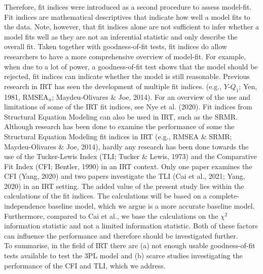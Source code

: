 \documentclass[Royal,sageapa,times,doublespace]{sagej}
\begin{document}
\indent Therefore, fit indices were introduced as a second procedure to assess model-fit. Fit indices are mathematical descriptives that indicate how well a model fits to the data. Note, however, that fit indices alone are not sufficient to infer whether a model fits well as they are not an inferential statistic and only describe the overall fit. Taken together with goodness-of-fit tests, fit indices do allow researchers to have a more comprehensive overview of model-fit. For example, when due to a lot of power, a goodness-of-fit test shows that the model should be rejected, fit indices can indicate whether the model is still reasonable. Previous research in IRT has seen the development of multiple fit indices. (e.g., $Y\text{-}Q_1$; Yen, 1981, $\text{RMSEA}_n$; Maydeu-Olivares \& Joe, 2014). For an overview of the use and limitations of some of the IRT fit indices, see Nye et al. (2020). Fit indices from Structural Equation Modeling can also be used in IRT, such as the SRMR. Although research has been done to examine the performance of some the Structural Equation Modeling fit indices in IRT (e.g., RMSEA \& SRMR; Maydeu-Olivares \& Joe, 2014), hardly any research has been done towards the use of the Tucker-Lewis Index (TLI; Tucker \& Lewis, 1973) and the Comparative Fit Index (CFI; Bentler, 1990) in an IRT context. Only one paper examines the CFI (Yang, 2020) and two papers investigate the TLI (Cai et al., 2021; Yang, 2020) in an IRT setting. The added value of the present study lies within the calculations of the fit indices. The calculations will be based on a complete-independence baseline model, which we argue is a more accurate baseline model. Furthermore, compared to Cai et al., we base the calculations on the $\chi^2$ information statistic and not a limited information statistic. Both of these factors can influence the performance and therefore should be investigated further. \\
\indent To summarise, in the field of IRT there are (a) not enough usable goodness-of-fit tests available to test the 3PL model and (b) scarce studies investigating the performance of the CFI and TLI, which we address.
\end{document}
